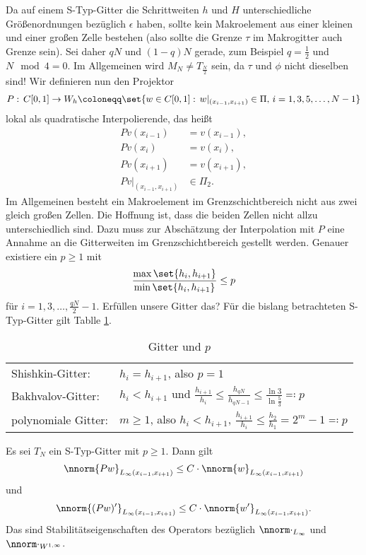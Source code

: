 Da auf einem S-Typ-Gitter die Schrittweiten $h$ und $H$ unterschiedliche Größenordnungen bezüglich $\epsilon$ haben, sollte kein Makroelement aus einer kleinen und einer großen Zelle bestehen (also sollte die Grenze $\tau$ im Makrogitter auch Grenze sein). Sei daher $qN$ und $(1-q)N$ gerade, zum Beispiel $q = \frac 12$ und $N \mod 4 = 0$. Im Allgemeinen wird $M_{N} \neq T_{\frac N 2}$ sein, da $\tau$ und $\phi$ nicht dieselben sind! Wir definieren nun den Projektor
\begin{align*}
  P: \, C[0, 1] \to W_{h} \coloneqq \set{w \in C[0, 1]: \, w|_{(x_{i-1}, x_{i+1})} \in \Pi, \, i = 1, 3, 5, \dots, N-1}
\end{align*}
lokal als quadratische Interpolierende, das heißt
\begin{align*}
  Pv(x_{i-1}) &= v(x_{i-1}),\\
  Pv(x_{i}) &= v(x_{i}),\\
  Pv(x_{i+1}) &= v(x_{i+1}),\\
  Pv|_{(x_{i-1}, x_{i+1})} &\in \Pi_{2}.
\end{align*}
Im Allgemeinen besteht ein Makroelement im Grenzschichtbereich nicht aus zwei gleich großen Zellen. Die Hoffnung ist, dass die beiden Zellen nicht allzu unterschiedlich sind. Dazu muss zur Abschätzung der Interpolation mit $P$ eine Annahme an die Gitterweiten im Grenzschichtbereich gestellt werden. Genauer existiere ein $p\geq 1$ mit
\begin{align*}
  \frac{\max \set{h_{i}, h_{i+1}}}{\min \set{h_{i}, h_{i+1}}}\leq p
\end{align*}
für $i = 1, 3, \dots, \frac {qN} 2 - 1$. Erfüllen unsere Gitter das? Für die bislang betrachteten S-Typ-Gitter gilt Tablle \ref{tab:gitter_u_h}. 
\begin{table}[h!]
  \centering
  \begin{tabular}[h!]{l l}
    Shishkin-Gitter: & $h_{i} = h_{i+1}$, also $p = 1$\\
    Bakhvalov-Gitter: & $h_{i} < h_{i+1}$ und $\frac{h_{i+1}}{h_{i}} \leq \frac{h_{qN}}{h_{qN-1}} \leq \frac{\ln 3}{\ln \frac 53} \eqqcolon p$\\
    polynomiale Gitter: & $m \geq 1$, also $h_{i}< h_{i+1}$, $\frac{h_{i+1}}{h_{i}} \leq \frac{h_{2}}{h_{1}} = 2^{m} -1 \eqqcolon p$
  \end{tabular}
  \caption{Gitter und $p$}
  \label{tab:gitter_u_h}
\end{table}
\begin{lemma}\label{lem:6-17}
  Es sei $T_{N}$ ein S-Typ-Gitter mit $p\geq 1$. Dann gilt
  \begin{align*}
    \nnorm{Pw}_{L_{\infty}(x_{i-1}, x_{i+1})} \leq C \cdot\nnorm{w}_{L_{\infty}(x_{i-1}, x_{i+1})}
  \end{align*}
und
\begin{align*}
   \nnorm{(Pw)'}_{L_{\infty}(x_{i-1}, x_{i+1})} \leq C \cdot\nnorm{w'}_{L_{\infty}(x_{i-1}, x_{i+1})}. 
\end{align*}
Das sind Stabilitätseigenschaften des Operators bezüglich $\nnorm \cdot_{L_{\infty}}$ und $\nnorm \cdot_{W^{1, \infty}}$.
\end{lemma}
